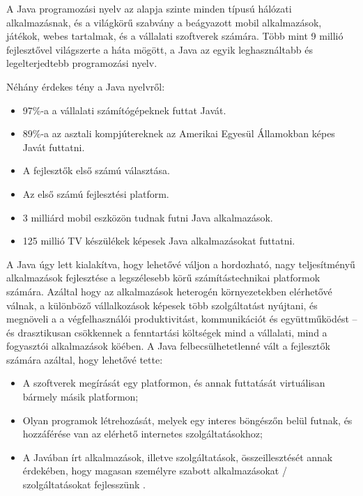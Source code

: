 \documentclass[a4paper,12pt]{report}
\begin{document}
A Java programozási nyelv az alapja szinte minden típusú hálózati alkalmazásnak, és a világkörű szabvány a beágyazott mobil alkalmazások, játékok, webes tartalmak, és a vállalati szoftverek számára. Több mint 9 millió fejlesztővel világszerte a háta mögött, a Java az egyik leghasználtabb és legelterjedtebb programozási nyelv. 

\vspace{2mm}
Néhány érdekes tény a Java nyelvről:

\begin{itemize}
\item 97\%-a a vállalati számítógépeknek futtat Javát.
\item 89\%-a az asztali kompjútereknek az Amerikai Egyesül Államokban képes Javát futtatni.
\item A fejlesztők első számú választása.
\item Az első számú fejlesztési platform.
\item 3 milliárd mobil eszközön tudnak futni Java alkalmazások.
\item 125 millió TV készülékek képesek Java alkalmazásokat futtatni.
\end{itemize}

\vspace{2mm}
A Java úgy lett kialakítva, hogy lehetővé váljon a hordozható, nagy teljesítményű alkalmazások fejlesztése a legszélesebb körű számítástechnikai platformok számára. Azáltal hogy az alkalmazások heterogén környezetekben elérhetővé válnak, a különböző vállalkozások képesek több szolgáltatást nyújtani, és megnöveli a a végfelhasználói produktivitást, kommunikációt és együttműködést -- és drasztikusan csökkennek a fenntartási költségek mind a vállalati, mind a fogyasztói alkalmazások köében. A Java felbecsülhetetlenné vált a fejlesztők számára azáltal, hogy lehetővé tette:

\begin{itemize}
\item A szoftverek megírását egy platformon, és annak futtatását virtuálisan bármely másik platformon;
\item Olyan programok létrehozását, melyek egy interes böngészőn belül futnak, és hozzáférése van az elérhető internetes szolgáltatásokhoz;
\item A Javában írt alkalmazások, illetve szolgáltatások, összeillesztését annak érdekében, hogy magasan személyre szabott alkalmazásokat / szolgáltatásokat fejlesszünk \cite{aboutjava}.
\end{itemize}
\end{document}
